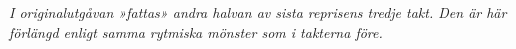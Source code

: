 \vspace{5mm}
\textit{I originalutgåvan »fattas» andra halvan av sista reprisens tredje takt. Den är här förlängd enligt samma rytmiska mönster som i takterna före.}